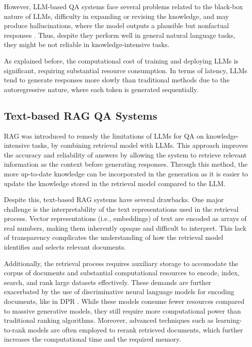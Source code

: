 However, LLM-based QA systems face several problems related to the black-box
nature of LLMs, difficulty in expanding or revising the knowledge, and 
may produce hallucinations, where the model outputs a plausible but nonfactual
responses \citep{lewis2021retrievalaugmentedgenerationknowledgeintensivenlp}.
Thus, despite they perform well in general natural language tasks,
they might be not reliable in knowledge-intensive tasks.

As explained before, the computational cost of training and deploying LLMs is
significant, requiring substantial resource consumption.
In terms of latency, LLMs tend to generate responses more slowly than
traditional methods due to the autoregressive nature, where each token
is generated sequentially.

\subsection{Text-based RAG QA Systems}
RAG \citep{lewis2021retrievalaugmentedgenerationknowledgeintensivenlp} was introduced to remedy the limitations of LLMs for QA on 
knowledge-intensive tasks, by combining retrieval model with LLMs. This
approach improves the accuracy and reliability of answers by allowing
the system to retrieve relevant information as the context before generating
responses. Through this method, the more up-to-date knowledge can be
incorporated in the generation as it is easier to update the knowledge
stored in the retrieval model compared to the LLM. 

Despite this, text-based RAG systems have several drawbacks. One major
challenge is the interpretability of the text representations used in
the retrieval process. Vector representations (i.e., embeddings) of 
text are encoded as arrays of real numbers, making them inherently 
opaque and difficult to interpret. This lack of transparency complicates 
the understanding of how the retrieval model identifies and selects 
relevant documents.

Additionally, the retrieval process requires auxiliary
storage to accomodate the corpus of documents and substantial computational 
resources to encode, index, search, and rank
large datasets effectively. These demands are further exacerbated by 
the use of discriminative neural language models for encoding documents, like in DPR \citep{karpukhin2020densepassageretrievalopendomain}. 
While these models consume fewer resources compared to massive 
generative models, they still require more computational 
power than traditional ranking algorithms. Moreover, advanced techniques 
such as learning-to-rank models are often employed to rerank 
retrieved documents, which further increases the computational time and the required memory.

